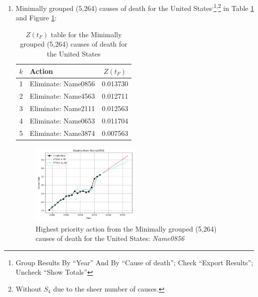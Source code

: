 \documentclass[12pt, a4paper, twocolumn]{article}
\begin{document}
\begin{enumerate}
  \item Minimally grouped (5,264) causes of death for the United States\cite{centers2017underlying}\textsuperscript{,}\footnote{Group Results By \enquote{Year} And By \enquote{Cause of death}; Check \enquote{Export Results}; Uncheck \enquote{Show Totals}}\textsuperscript{,}\footnote{Without $S_4$ due to the sheer number of causes.} in Table \ref{table:ztable7} and Figure \ref{fig:k7}:
    \begin{table}[H]
      \centering
      \begin{tabular}{clc}
        \toprule
          $k$ & Action              & $Z(t_F)$ \\
        \midrule
          1   & Eliminate: Name0856 & 0.013730 \\
          2   & Eliminate: Name4563 & 0.012711 \\
          3   & Eliminate: Name2111 & 0.012563 \\
          4   & Eliminate: Name0653 & 0.011704 \\
          5   & Eliminate: Name3874 & 0.007563 \\
        \bottomrule
      \end{tabular}
      \caption{$Z(t_F)$ table for the Minimally grouped (5,264) causes of death for the United States}
      \label{table:ztable7}
    \end{table}
    \begin{figure}[H]
      \centering
      \includegraphics[width=0.5\textwidth]{results/US_ICD10_MINIMALLY_GROUPED/Name0856_ets.png}
      \caption{Highest priority action from the Minimally grouped (5,264) causes of death for the United States: \textit{Name0856}}\label{fig:k7}
    \end{figure}
  

\end{enumerate}
\end{document}
